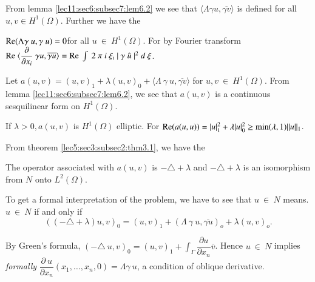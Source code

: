 From lemma \ref{lec11:sec6:subsec7:lem6.2} we see that $\langle \Lambda \gamma u,
\overline{\gamma v} \rangle$ is defined for all $u,v \in 
H^1(\Omega)$. Further we have the 
\begin{lemma}\label{lec11:sec6:subsec7:lem6.3}%
  $\operatorname{Re}  (\Lambda \gamma ~ u, \gamma ~u) = 0$\pageoriginale for all $u ~ \in ~
  H^1(\Omega)$. For by Fourier transform $\operatorname{Re}  ~ \langle
  \dfrac{\partial}{\partial x_i} ~ \gamma u, \overline{\gamma u}
  \rangle = \operatorname{Re}  ~ \int ~ 2 ~ \pi ~ i ~ \xi_i ~ | ~ \gamma ~ \hat{u} ~
  |^2 ~ d ~ \xi$. 
\end{lemma}

Let $a(u,v) = (u,v)_1 + \lambda (u,v)_0 + \langle \Lambda ~ \gamma ~
u, \overline{\gamma v} \rangle$ for $u,v ~ \in ~
H^1(\Omega)$. From lemma \ref{lec11:sec6:subsec7:lem6.2}, we see that $a(u,v)$ is a continuous
sesquilinear form on $H^1(\Omega)$. 

\begin{lemma}\label{lec11:sec6:subsec7:lem6.4} %
  If $\lambda > 0, a(u,v)$ is $H^1(\Omega)$ elliptic. For $\operatorname{Re}  (a(u,u))
  = | u |^2_1 + \lambda | u |^2_0 \ge \min (\lambda,1) || u ||_1$. 
\end{lemma}

From theorem \ref{lec5:sec3:subsec2:thm3.1}, we have the 
\begin{theorem}\label{lec11:sec6:subsec7:thm6.10}%
  The operator associated with $a(u,v)$ is $-\triangle + \lambda$ and $
  - \triangle + \lambda $ is an isomorphism from $N$ onto
  $L^2(\Omega)$. 
\end{theorem}

To get a formal interpretation of the problem, we have to see that $ u
~ \in ~ N$ means. $u ~\in ~ N$ if and only if 
$$
(( - \triangle + \lambda) u,v)_0 = (u,v)_1 + (\Lambda ~\gamma ~
u,\overline{\gamma u})_o + \lambda(u,v)_o. 
$$

By Green's formula, $(-\triangle ~ u, v)_0 = (u,v)_1 +
\int_{\Gamma}\dfrac{\partial u}{\partial x_n} \bar{v}$. Hence $u ~
\in ~ N$ implies \textit{formally} $\dfrac{\partial ~
  u}{\partial x_n}(x_1, \ldots ,x_n, 0) = \Lambda \gamma ~ u$, a
condition of oblique derivative. 

